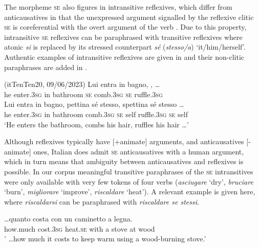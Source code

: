 \documentclass[output=paper,colorlinks,citecolor=brown
]{langscibook}
\begin{document}
The morpheme \textsc{se} also figures in intransitive reflexives, which differ from anticausatives in that the unexpressed argument signalled by the reflexive clitic \textsc{se} is coreferential with the overt argument of the verb \citep[257, 126—136]{vanvalin1990semantic,bentley2006split}. Due to this property, intransitive \textsc{se} reflexives can be paraphrased with transitive reflexives where atonic \textit{si} is replaced by its stressed counterpart \textit{sé} (\textit{stesso/a}) ‘it/him/herself’. Authentic examples of intransitive reflexives are given in  and their non-clitic paraphrases are added in .


\hspace*{\fill}(itTenTen20, 09/06/2023)\quad
\ea \label{bentley_example_4}
    \ea \label{bentley_example_4a}
    \gll Lui entra in bagno,  ,   \ldots  \\
    he enter.3\textsc{sg} in bathroom \textsc{se} comb.3\textsc{sg} \textsc{se} ruffle.3\textsc{sg} \\
    \ex \label{bentley_example_4b}
    \gll Lui entra in bagno, pettina sé stesso, spettina sé stesso \ldots  \\
    he enter.3\textsc{sg} in bathroom comb.3\textsc{sg} \textsc{se} self ruffle.3\textsc{sg} \textsc{se} self  \\
    \glt ‘He enters the bathroom, combs his hair, ruffles his hair  \ldots ’  \\
    \z
\z

Although reflexives typically have [+animate] arguments, and anticausatives [-animate] ones, Italian does admit \textsc{se} anticausatives with a human argument, which in turn means that ambiguity between anticausatives and reflexives is possible. In our corpus meaningful transitive paraphrases of the \textsc{se} intransitives were only available with very few tokens of four verbs (\textit{asciugare} ‘dry’, \textit{bruciare} ‘burn’, \textit{migliorare} ‘improve’, \textit{riscaldare} ‘heat’). A relevant example is given here, where \textit{riscaldarsi} can be paraphrased with \textit{riscaldare se stessi}.

\ea \label{bentley_example_5}
\gll  \ldots  quanto costa  con un caminetto a legna. \\
    how.much	cost.3\textsc{sg} heat.\textsc{se} with a stove at wood \\
\glt ' \ldots  how much it costs to keep warm using a wood-burning stove.’
\z
\end{document}
